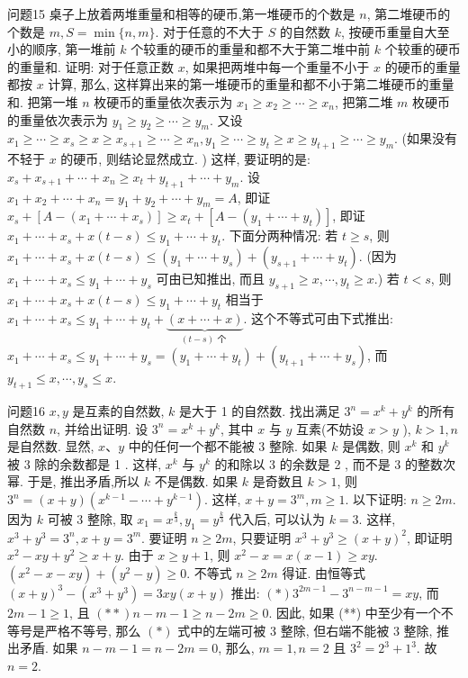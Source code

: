 问题15 桌子上放着两堆重量和相等的硬币,第一堆硬币的个数是 $n$, 第二堆硬币的个数是 $m, S=\min \{n, m\}$. 对于任意的不大于 $S$ 的自然数 $k$, 按硬币重量自大至小的顺序, 第一堆前 $k$ 个较重的硬币的重量和都不大于第二堆中前 $k$ 个较重的硬币的重量和.
证明: 对于任意正数 $x$, 如果把两堆中每一个重量不小于 $x$ 的硬币的重量都按 $x$ 计算, 那么, 这样算出来的第一堆硬币的重量和都不小于第二堆硬币的重量和.
把第一堆 $n$ 枚硬币的重量依次表示为 $x_1 \geqslant x_2 \geqslant \cdots \geqslant x_n$, 把第二堆 $m$ 枚硬币的重量依次表示为 $y_1 \geqslant y_2 \geqslant \cdots \geqslant y_m$. 又设 $x_1 \geqslant \cdots \geqslant x_s \geqslant x \geqslant x_{s+1} \geqslant \cdots \geqslant x_n, y_1 \geqslant \cdots \geqslant y_t \geqslant x \geqslant y_{t+1} \geqslant \cdots \geqslant y_m$. (如果没有不轻于 $x$ 的硬币, 则结论显然成立.
) 这样, 要证明的是: $x_s+x_{s+1}+\cdots+x_n \geqslant x_t+ y_{t+1}+\cdots+y_m$. 设 $x_1+x_2+\cdots+x_n=y_1+y_2+\cdots+y_m=A$, 即证 $x_s+[A- \left(x_1+\cdots+x_s\right) ] \geqslant x_t+\left[A-\left(y_1+\cdots+y_t\right)\right]$, 即证 $x_1+\cdots+x_s+x(t-s) \leqslant y_1+\cdots+y_t$. 下面分两种情况:
若 $t \geqslant s$, 则 $x_1+\cdots+x_s+x(t-s) \leqslant\left(y_1+\cdots+y_s\right)+\left(y_{s+1}+\cdots+y_t\right)$. (因为 $x_1+\cdots+x_s \leqslant y_1+\cdots+y_s$ 可由已知推出, 而且 $y_{s+1} \geqslant x, \cdots, y_t \geqslant x$.)
若 $t<s$, 则 $x_1+\cdots+x_s+x(t-s) \leqslant y_1+\cdots+y_t$ 相当于 $x_1+\cdots+x_s \leqslant y_1+\cdots+y_t+\underbrace{(x+\cdots+x)}_{(t-s) \text { 个 }}$. 这个不等式可由下式推出: $x_1+\cdots+x_s \leqslant y_1+ \cdots+y_s=\left(y_1+\cdots+y_t\right)+\left(y_{t+1}+\cdots+y_s\right)$, 而 $y_{t+1} \leqslant x, \cdots, y_s \leqslant x$.



问题16 $x, y$ 是互素的自然数, $k$ 是大于 1 的自然数.
找出满足 $3^n=x^k+y^k$ 的所有自然数 $n$, 并给出证明.
设 $3^n=x^k+y^k$, 其中 $x$ 与 $y$ 互素(不妨设 $x>y$ ), $k>1, n$ 是自然数.
显然, $x 、 y$ 中的任何一个都不能被 3 整除.
如果 $k$ 是偶数, 则 $x^k$ 和 $y^k$ 被 3 除的余数都是 1 . 这样, $x^k$ 与 $y^k$ 的和除以 3 的余数是 2 , 而不是 3 的整数次幂.
于是, 推出矛盾,所以 $k$ 不是偶数.
如果 $k$ 是奇数且 $k>1$, 则 $3^n=(x+y)\left(x^{k-1}-\cdots+y^{k-1}\right)$. 这样, $x+y= 3^m, m \geqslant 1$.
以下证明: $n \geqslant 2 m$. 因为 $k$ 可被 3 整除, 取 $x_1=x^{\frac{k}{3}}, y_1=y^{\frac{k}{3}}$ 代入后, 可以认为 $k=3$. 这样, $x^3+y^3=3^n, x+y=3^m$. 要证明 $n \geqslant 2 m$, 只要证明 $x^3+ y^3 \geqslant(x+y)^2$, 即证明 $x^2-x y+y^2 \geqslant x+y$. 由于 $x \geqslant y+1$, 则 $x^2-x= x(x-1) \geqslant x y$. $\left(x^2-x-x y\right)+\left(y^2-y\right) \geqslant 0$. 不等式 $n \geqslant 2 m$ 得证.
由恒等式 $(x+y)^3-\left(x^3+y^3\right)=3 x y(x+y)$ 推出: $(*) 3^{2 m-1}-3^{n-m-1}= x y$, 而 $2 m-1 \geqslant 1$, 且 $(* *) n-m-1 \geqslant n-2 m \geqslant 0$. 因此, 如果 (**) 中至少有一个不等号是严格不等号, 那么 $(*)$ 式中的左端可被 3 整除, 但右端不能被 3 整除, 推出矛盾.
如果 $n-m-1=n-2 m=0$, 那么, $m=1, n=2$ 且 $3^2=2^3+1^3$. 故 $n=2$.



